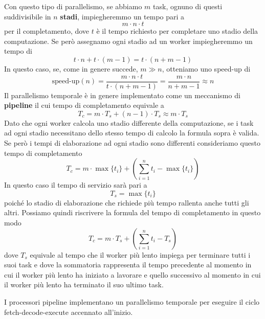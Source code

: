 Con questo tipo di parallelismo, se abbiamo $m$ task, ognuno di questi suddivisibile in $n$
\textbf{stadi}, impiegheremmo un tempo pari a
\[ m \cdot n \cdot t \]
per il completamento, dove $t$ è il tempo richiesto per completare uno stadio della computazione.
Se però assegnamo ogni stadio ad un worker impiegheremmo un tempo di
\[ t \cdot n + t \cdot (m - 1) = t \cdot (n + m - 1) \]
In questo caso, se, come in genere succede, $m \gg n$, otteniamo uno speed-up di
\[
	\text{speed-up} (n) = \frac{m \cdot n \cdot t}{t \cdot (n + m - 1)}
	= \frac{m \cdot n}{n + m - 1} \approx n
\]
Il parallelismo temporale è in genere implementato come un
meccanismo di \textbf{pipeline} il cui tempo di completamento equivale a
\[ T_c = m \cdot T_s + (n - 1) \cdot T_s \approx m \cdot T_s \]
Dato che ogni worker calcola uno stadio differente della computazione, se i task ad ogni stadio
necessitano dello stesso tempo di calcolo la formula sopra è valida. Se però i tempi di
elaborazione ad ogni stadio sono differenti consideriamo questo tempo di completamento
\[ T_c = m \cdot \max \{ t_i \} + \left( \sum_{i=1}^n t_i - \max \{ t_i \} \right) \]
In questo caso il tempo di servizio sarà pari a
\[ T_s = \max \{ t_i \} \]
poiché lo stadio di elaborazione che richiede più tempo rallenta anche tutti gli altri. Possiamo
quindi riscrivere la formula del tempo di completamento in questo modo
\[ T_c = m \cdot T_s + \left( \sum_{i=1}^n t_i - T_s \right) \]
dove $T_s$ equivale al tempo che il worker più lento impiega per terminare tutti i suoi task e dove
la sommatoria rappresenta il tempo precedente al momento in cui il worker più lento ha iniziato a
lavorare e quello successivo al momento in cui il worker più lento ha terminato il suo ultimo task.

I processori pipeline implementano un parallelismo temporale per eseguire il ciclo
fetch-decode-execute accennato all'inizio.
